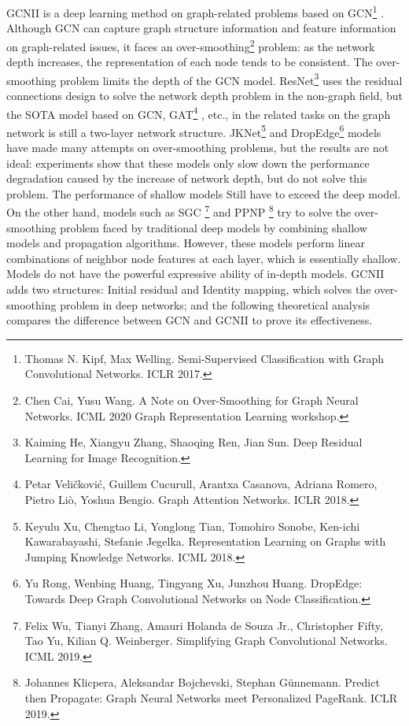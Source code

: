 \documentclass[11pt]{article}
\begin{document}
GCNII is a deep learning method on graph-related problems based on GCN\footnote{Thomas N. Kipf, Max Welling. Semi-Supervised Classification with Graph Convolutional Networks. ICLR 2017.} . Although GCN can capture graph structure information and feature information on graph-related issues, it faces an over-smoothing\footnote{Chen Cai, Yusu Wang. A Note on Over-Smoothing for Graph Neural Networks. ICML 2020 Graph Representation Learning workshop. }  problem: as the network depth increases, the representation of each node tends to be consistent. The over-smoothing problem limits the depth of the GCN model. ResNet\footnote{Kaiming He, Xiangyu Zhang, Shaoqing Ren, Jian Sun. Deep Residual Learning for Image Recognition.}  uses the residual connections design to solve the network depth problem in the non-graph field, but the SOTA model based on GCN, GAT\footnote{Petar Veličković, Guillem Cucurull, Arantxa Casanova, Adriana Romero, Pietro Liò, Yoshua Bengio. Graph Attention Networks. ICLR 2018.} , etc., in the related tasks on the graph network is still a two-layer network structure. JKNet\footnote{Keyulu Xu, Chengtao Li, Yonglong Tian, Tomohiro Sonobe, Ken-ichi Kawarabayashi, Stefanie Jegelka. Representation Learning on Graphs with Jumping Knowledge Networks. ICML 2018.}  and DropEdge\footnote{Yu Rong, Wenbing Huang, Tingyang Xu, Junzhou Huang. DropEdge: Towards Deep Graph Convolutional Networks on Node Classification.}  models have made many attempts on over-smoothing problems, but the results are not ideal: experiments show that these models only slow down the performance degradation caused by the increase of network depth, but do not solve this problem. The performance of shallow models Still have to exceed the deep model. On the other hand, models such as SGC \footnote{Felix Wu, Tianyi Zhang, Amauri Holanda de Souza Jr., Christopher Fifty, Tao Yu, Kilian Q. Weinberger. Simplifying Graph Convolutional Networks. ICML 2019. } and PPNP \footnote{Johannes Klicpera, Aleksandar Bojchevski, Stephan Günnemann. Predict then Propagate: Graph Neural Networks meet Personalized PageRank. ICLR 2019.} try to solve the over-smoothing problem faced by traditional deep models by combining shallow models and propagation algorithms. However, these models perform linear combinations of neighbor node features at each layer, which is essentially shallow. Models do not have the powerful expressive ability of in-depth models. GCNII adds two structures: Initial residual and Identity mapping, which solves the over-smoothing problem in deep networks; and the following theoretical analysis compares the difference between GCN and GCNII to prove its effectiveness.
\end{document}
